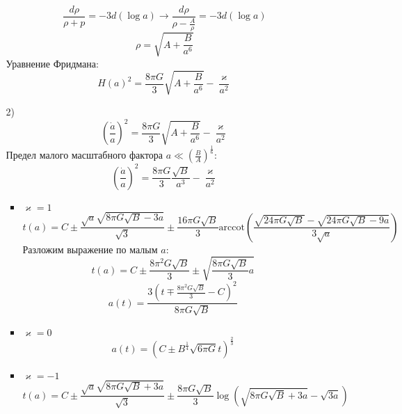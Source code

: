 \documentclass[12pt]{article}
\theoremstyle{definition}
\begin{document}
\begin{enumerate}
\begin{itemize}
\begin{equation}
            \frac{d\rho}{\rho+p}=-3d(\log a)\rightarrow\frac{d\rho}{\rho-\frac{A}{\rho}}=-3d(\log a)
        \end{equation}
        \begin{equation}
            \rho=\sqrt{A+\frac{B}{a^6}}
        \end{equation}
        Уравнение Фридмана:
        \begin{equation}
            \boxed{H(a)^2=\frac{8\pi G}{3}\sqrt{A+\frac{B}{a^6}}-\frac{\varkappa}{a^2}}
        \end{equation}
        \item[2)]
        \begin{equation}
            \left(\frac{\dot{a}}{a}\right)^2=\frac{8\pi G}{3}\sqrt{A+\frac{B}{a^6}}-\frac{\varkappa}{a^2}
        \end{equation}
        Предел малого масштабного фактора $a\ll\left(\frac{B}{A}\right)^\frac{1}{6}$:
        \begin{equation}
            \left(\frac{\dot{a}}{a}\right)^2=\frac{8\pi G}{3}\frac{\sqrt{B}}{a^3}-\frac{\varkappa}{a^2}
        \end{equation}
        \begin{itemize}
            \item $\varkappa=1$
            \begin{equation*}
                t(a)=C\pm\frac{\sqrt{a}\sqrt{8\pi G\sqrt{B}-3a}}{\sqrt{3}}\pm\frac{16\pi G\sqrt{B}}{3}\text{arccot}\left(\frac{\sqrt{24\pi G\sqrt{B}}-\sqrt{24\pi G\sqrt{B}-9a}}{3\sqrt{a}}\right)
            \end{equation*}
            Разложим выражение по малым $a$:
            \begin{equation}
                t(a)=C\pm\frac{8\pi^2 G\sqrt{B}}{3}\pm\sqrt{\frac{8\pi G\sqrt{B}}{3}a}
            \end{equation}
            \begin{equation}
                \boxed{a(t)=\frac{3(t\mp\frac{8\pi^2G\sqrt{B}}{3}-C)^2}{8\pi G\sqrt{B}}}
            \end{equation}
            \item $\varkappa=0$
            \begin{equation}
                \boxed{a(t)=\left(C\pm B^\frac{1}{4}\sqrt{6\pi G}t\right)^\frac{2}{3}}
            \end{equation}
            \item $\varkappa=-1$
            \begin{equation}
                t(a)=C\pm\frac{\sqrt{a}\sqrt{8\pi G\sqrt{B}+3a}}{\sqrt{3}}\pm\frac{8\pi G\sqrt{B}}{3}\log\left(\sqrt{8\pi G\sqrt{B}+3a}-\sqrt{3a}\right)

\end{equation}
\end{itemize}
\end{itemize}
\end{enumerate}
\end{document}
